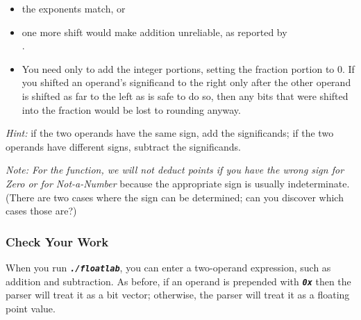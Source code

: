 \begin{description}
    \begin{itemize}
        \item the exponents match, or
        \item one more shift would make addition unreliable, as reported by \\ .
    \end{itemize}
    \begin{itemize}
        \item You need only to add the integer portions, setting the fraction portion to 0.
        If you shifted an operand's significand to the right only after the other operand is shifted as far to the left as is safe to do so, then any bits that were shifted into the fraction would be lost to rounding anyway.
    \end{itemize}
\end{description}

\textit{Hint:} if the two operands have the same sign, add the significands;
if the two operands have different signs, subtract the significands.

\textit{Note: For the  function, we will not deduct points if you have the wrong sign for Zero or for Not-a-Number} because the appropriate sign is usually indeterminate.
(There are two cases where the sign can be determined; can you discover which cases those are?)


\subsubsection*{Check Your Work}

When you run \texttt{\textbf{\textit{./floatlab}}}, you can enter a two-operand expression, such as addition and subtraction.
As before, if an operand is prepended with \texttt{\textbf{\textit{0x}}} then the parser will treat it as a bit vector;
otherwise, the parser will treat it as a floating point value.

